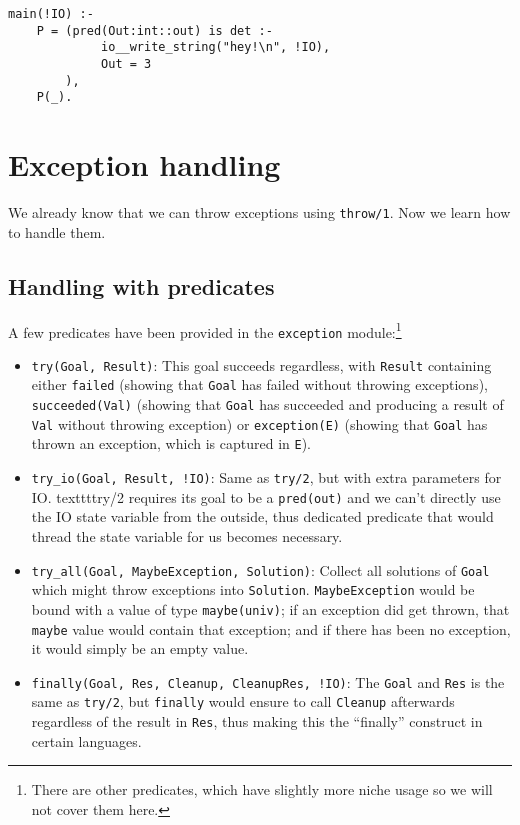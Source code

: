 \begin{lstlisting}[language=Mercury]
main(!IO) :-
	P = (pred(Out:int::out) is det :-
			 io__write_string("hey!\n", !IO),
			 Out = 3
		),
	P(_).
\end{lstlisting}


\section{Exception handling}

We already know that we can throw exceptions using \texttt{throw/1}. Now we learn how to handle them.

\subsection{Handling with predicates}

A few predicates have been provided in the \texttt{exception} module:\footnote{There are other predicates, which have slightly more niche usage so we will not cover them here.}

\begin{itemize}
\item \texttt{try(Goal, Result)}: This goal succeeds regardless, with \texttt{Result} containing either \texttt{failed} (showing that \texttt{Goal} has failed without throwing exceptions), \texttt{succeeded(Val)} (showing that \texttt{Goal} has succeeded and producing a result of \texttt{Val} without throwing exception) or \texttt{exception(E)} (showing that \texttt{Goal} has thrown an exception, which is captured in \texttt{E}).
\item \texttt{try_io(Goal, Result, !IO)}: Same as \texttt{try/2}, but with extra parameters for IO. texttt{try/2} requires its goal to be a \texttt{pred(out)} and we can't directly use the IO state variable from the outside, thus dedicated predicate that would thread the state variable for us becomes necessary.
\item \texttt{try_all(Goal, MaybeException, Solution)}: Collect all solutions of \texttt{Goal} which might throw exceptions into \texttt{Solution}. \texttt{MaybeException} would be bound with a value of type \texttt{maybe(univ)}; if an exception did get thrown, that \texttt{maybe} value would contain that exception; and if there has been no exception, it would simply be an empty value.
  \item \texttt{finally(Goal, Res, Cleanup, CleanupRes, !IO)}: The \texttt{Goal} and \texttt{Res} is the same as \texttt{try/2}, but \texttt{finally} would ensure to call \texttt{Cleanup} afterwards regardless of the result in \texttt{Res}, thus making this the ``finally'' construct in certain languages. 
  \end{itemize}

